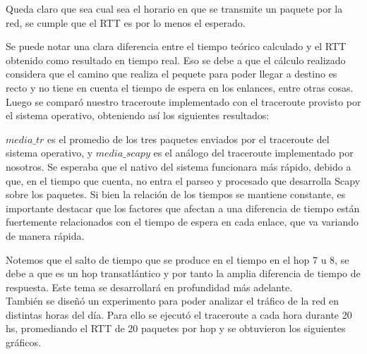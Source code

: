 
Queda claro que sea cual sea el horario en que se transmite un paquete por la red, se cumple que el RTT es por lo menos el esperado. 

Se puede notar una clara diferencia entre el tiempo teórico calculado y el RTT obtenido como resultado en tiempo real. Eso se debe a que el cálculo realizado considera que el camino que realiza el pequete para poder llegar a destino es recto y no tiene en cuenta el tiempo de espera en los enlances, entre otras cosas. \\

Luego se comparó nuestro traceroute implementado con el traceroute provisto por el sistema operativo, obteniendo así los siguientes resultados: 




$media\_tr$ es el promedio de los tres paquetes enviados por el traceroute del sistema operativo, y $media\_scapy$ es el an\'alogo del traceroute implementado por nosotros. Se esperaba que el nativo del sistema funcionara m\'as r\'apido, debido a que, en el tiempo que cuenta, no entra el parseo y procesado que desarrolla Scapy sobre los paquetes. Si bien la relaci\'on de los tiempos se mantiene constante, es importante destacar que los factores que afectan a una diferencia de tiempo están fuertemente relacionados con el tiempo de espera en cada enlace, que va variando de manera rápida. 

Notemos que el salto de tiempo que se produce en el tiempo en el hop 7 u 8, se debe a que es un hop transatl\'antico y por tanto la amplia diferencia de tiempo de respuesta. Este tema se desarrollará en profundidad más adelante. \\

Tambi\'en se dise\~nó un experimento para poder analizar el tr\'afico de la red en distintas horas del d\'ia. Para ello se ejecutó el traceroute a cada hora durante 20 hs, promediando el RTT de 20 paquetes por hop y se obtuvieron los siguientes gr\'aficos.


